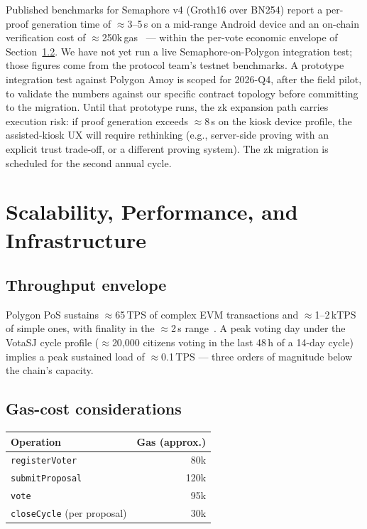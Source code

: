 \documentclass[12pt]{article}
\begin{document}
Published benchmarks for Semaphore v4 (Groth16 over BN254) report a per-proof
generation time of \(\approx\)3--5\,s on a mid-range Android device and an
on-chain verification cost of \(\approx\)250k\,gas~\cite{semaphoredocs} ---
within the per-vote economic envelope of
Section~\ref{sec:gas}. We have not yet run a live Semaphore-on-Polygon
integration test; those figures come from the protocol team's testnet
benchmarks. A prototype integration test against Polygon Amoy is scoped for
2026-Q4, after the field pilot, to validate the numbers against our specific
contract topology before committing to the migration. Until that prototype
runs, the zk expansion path carries execution risk: if proof generation
exceeds \(\approx\)8\,s on the kiosk device profile, the assisted-kiosk UX
will require rethinking (e.g., server-side proving with an explicit trust
trade-off, or a different proving system). The zk migration is scheduled for
the second annual cycle.

\section{Scalability, Performance, and Infrastructure}
\label{sec:scale}

\subsection{Throughput envelope}

Polygon PoS sustains \(\approx\)65\,TPS of complex EVM transactions and
\(\approx\)1--2\,kTPS of simple ones, with finality in the \(\approx\)2\,s
range~\cite{polygondocs}. A peak voting day under the VotaSJ cycle profile
(\(\approx\)20{,}000 citizens voting in the last 48\,h of a 14-day cycle)
implies a peak sustained load of \(\approx\)0.1\,TPS --- three orders of
magnitude below the chain's capacity.

\subsection{Gas-cost considerations}
\label{sec:gas}

\noindent\begin{tabular}{l r}
\toprule
\textbf{Operation} & \textbf{Gas (approx.)} \\
\midrule
\texttt{registerVoter} & 80k \\
\texttt{submitProposal} & 120k \\
\texttt{vote} & 95k \\
\texttt{closeCycle} (per proposal) & 30k \\
\bottomrule
\end{tabular}
\end{document}
